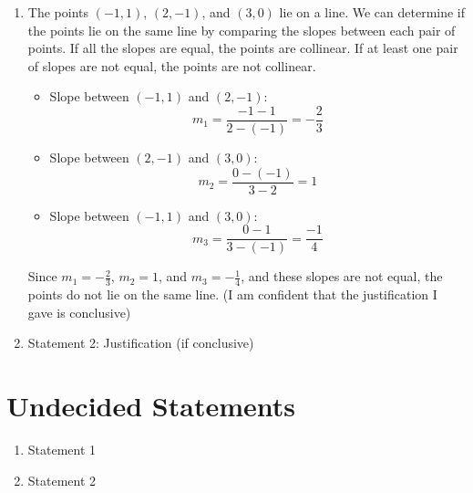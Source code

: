 \documentclass{article}
\begin{document}
\begin{enumerate}
    \item The points $(-1,1)$, $(2,-1)$, and $(3,0)$ lie on a line.\newline
          We can determine if the points lie on the same line by comparing the slopes between each pair of points.
          If all the slopes are equal, the points are collinear.
          If at least one pair of slopes are not equal, the points are not collinear.

          \begin{itemize}
              \item Slope between \((-1, 1)\) and \((2, -1)\):
                    \[
                        m_1 = \frac{-1 - 1}{2 - (-1)} = -\frac{2}{3}
                    \]

              \item Slope between \((2, -1)\) and \((3, 0)\):
                    \[
                        m_2 = \frac{0 - (-1)}{3 - 2} = 1
                    \]

              \item Slope between \((-1, 1)\) and \((3, 0)\):
                    \[
                        m_3 = \frac{0 - 1}{3 - (-1)} = \frac{-1}{4}
                    \]
          \end{itemize}

          Since \(m_1 = -\frac{2}{3}\), \(m_2 = 1\), and \(m_3 = -\frac{1}{4}\), and these slopes are not equal, the points do not lie on the same line. (I am confident that the justification I gave is conclusive)
    \item Statement 2: Justification (if conclusive)
\end{enumerate}

\section{Undecided Statements}

\begin{enumerate}
    \item Statement 1
    \item Statement 2
\end{enumerate}
\end{document}
